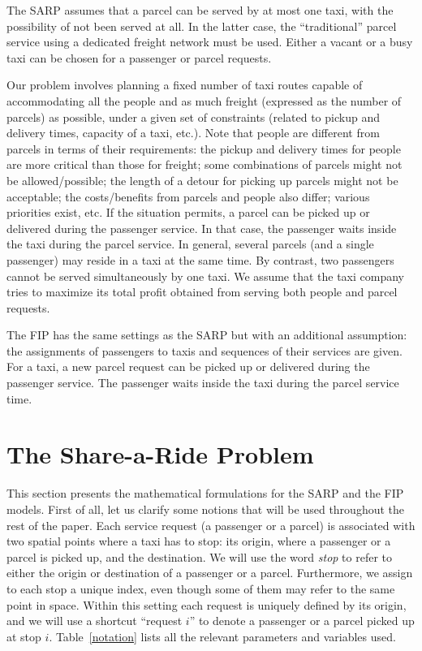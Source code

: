 \documentclass[preprint,authoryear,12pt]{elsarticle}
\begin{document}
The SARP assumes that a parcel can be served by at most one taxi, with the possibility of not been served at all. In the latter case, the ``traditional'' parcel service using a dedicated freight network must be used. Either a vacant or a busy taxi can be chosen for a passenger or parcel requests. 

Our problem involves planning a fixed number of taxi routes capable of accommodating all the people and as much freight (expressed as the number of parcels) as possible, under a given set of constraints (related to pickup and delivery times, capacity of a taxi, etc.). Note that people are different from parcels in terms of their requirements: the pickup and delivery times for people are more critical than those for freight; some combinations of parcels might not be allowed/possible; the length of a detour for picking up parcels might not be acceptable; the costs/benefits from parcels and people also differ; various priorities exist, etc. If the situation permits, a parcel can be picked up or delivered during the passenger service. In that case, the passenger waits inside the taxi during the parcel service. In general, several parcels (and a single passenger) may reside in a taxi at the same time. By contrast, two passengers cannot be served simultaneously by one taxi. We assume that the taxi company tries to maximize its total profit obtained from serving both people and parcel requests. 

The FIP has the same settings as the SARP but with an additional assumption: the assignments of passengers to taxis and sequences of their services are given. For a taxi, a new parcel request can be picked up or delivered during the passenger service. The passenger waits inside the taxi during the parcel service time.






\section{The Share-a-Ride Problem}\label{sarp_model}
This section presents the mathematical formulations for the SARP and the FIP models. First of all, let us clarify some notions that will be used throughout the rest of the paper. Each service request (a passenger or a parcel) is associated with two spatial points where a taxi has to stop: its origin, where a passenger or a parcel is picked up, and the destination. We will use the word \emph{stop} to refer to either the origin or destination of a passenger or a parcel. Furthermore, we assign to each stop a unique index, even though some of them may refer to the same point in space. Within this setting each request is uniquely defined by its origin, and we will use a shortcut ``request $i$'' to denote a passenger or a parcel picked up at stop $i$. Table~\ref{notation} lists all the relevant parameters and variables used.
\end{document}
